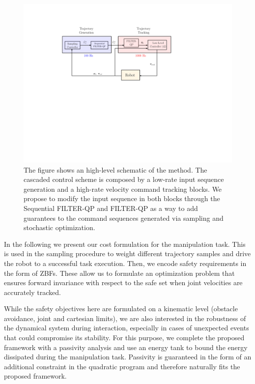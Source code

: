 \begin{figure}[t!]
\centering
\vspace{-0.5cm}
\includegraphics[width=0.95\columnwidth] {figures/schemes/receding_horizon_new_paper2.pdf}
\caption{The figure shows an high-level schematic of the method. The cascaded control scheme is composed by a low-rate input sequence generation and a high-rate velocity command tracking blocks. We propose to modify the input sequence in both blocks through the Sequential FILTER-QP and FILTER-QP as a way to add guarantees to the command sequences generated via sampling and stochastic optimization.} \label{fig:block_scheme}
\end{figure}


In the following we present our cost formulation for the manipulation task. This is used in the sampling procedure to weight different trajectory samples and drive the robot to a successful task execution. Then, we encode safety requirements in the form of ZBFs. These allow us to formulate an optimization problem that ensures forward invariance with respect to the safe set when joint velocities are accurately tracked.

While the safety objectives here are formulated on a kinematic level (obstacle avoidance, joint and cartesian limits), we are also interested in the robustness of the dynamical system during interaction, especially in cases of unexpected events that could compromise its stability. For this purpose, we complete the proposed framework with a passivity analysis and use an energy tank to bound the energy dissipated during the manipulation task. Passivity is guaranteed in the form of an additional constraint in the quadratic program and therefore naturally fits the proposed framework.

